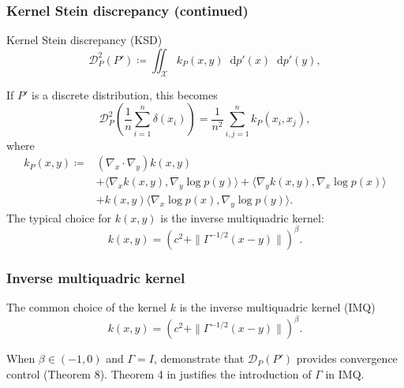\documentclass{beamer}
\newcommand*\diff{\mathop{}\!\mathrm{d}}
\begin{document}
\begin{frame}
\frametitle{Kernel Stein discrepancy (continued)}

\begin{block}{Kernel Stein discrepancy (KSD)}
\begin{equation*}
\mathcal{D}_{P}^2(P') \coloneq \iint_\mathcal{X} k_P(x, y) \diff p'(x) \diff p'(y),
\end{equation*}

\end{block}

If $P'$ is a discrete distribution, this becomes
\begin{equation*}
\mathcal{D}_{P}^2\left(\frac{1}{n} \sum_{i=1}^n \delta(x_i)\right) = \frac{1}{n^2} \sum_{i,j=1}^n k_P(x_i, x_j),
\end{equation*}
where
\begin{equation*}
\begin{aligned}
k_P(x, y) \coloneq 
&(\nabla_x\cdot\nabla_y) k(x,y) \\
&+ \langle \nabla_x k(x, y), \nabla_y \log p(y) \rangle + \langle \nabla_y k(x, y), \nabla_x \log p(x) \rangle \\
&+ k(x, y) \langle \nabla_x \log p(x), \nabla_y \log p(y) \rangle.
\end{aligned}
\end{equation*}
The typical choice for $k(x, y)$ is the inverse multiquadric kernel:
\begin{equation*}
k(x, y) = \left(c^2 + \|\Gamma^{-1/2}(x-y)\|\right)^\beta.
\end{equation*}

\end{frame}



\begin{frame}
\frametitle{Inverse multiquadric kernel}

The common choice of the kernel $k$ is the inverse multiquadric kernel (IMQ)
\begin{equation*}
k(x, y) = \left(c^2 + \|\Gamma^{-1/2}(x-y)\|\right)^\beta.
\end{equation*}

When $\beta \in (-1, 0)$ and $\Gamma = I$, \cite{gorhamMeasuringSampleQuality2017} demonstrate that $\mathcal{D}_{P}(P')$ provides convergence control (Theorem 8). Theorem 4 in \cite{chenSteinPointMarkov2019} justifies the introduction of $\Gamma$ in IMQ.

\end{frame}
\end{document}
